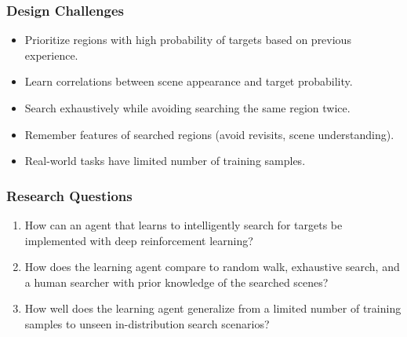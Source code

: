 \begin{frame}
    \frametitle{Design Challenges}

    \begin{itemize}
        \item Prioritize regions with high probability of targets based on previous experience.
        \item Learn correlations between scene appearance and target probability.
        \item Search exhaustively while avoiding searching the same region twice.
        \item Remember features of searched regions (avoid revisits, scene understanding).
        \item Real-world tasks have limited number of training samples.
    \end{itemize}
\end{frame}

\begin{frame}
    \frametitle{Research Questions}
    \begin{enumerate}
        \item How can an agent that learns to intelligently search for targets be implemented with deep reinforcement learning?
        \item How does the learning agent compare to random walk, exhaustive search, and a human searcher with prior knowledge of the searched scenes?
        \item How well does the learning agent generalize from a limited number of training samples to unseen in-distribution search scenarios?
    \end{enumerate}    
\end{frame}